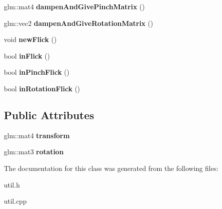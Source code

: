 \begin{DoxyCompactItemize}
\item 
\hypertarget{classpho_1_1flickManager_a413def44a7b636a274657ceb51d67baa}{glm\-::mat4 {\bfseries dampen\-And\-Give\-Pinch\-Matrix} ()}\label{classpho_1_1flickManager_a413def44a7b636a274657ceb51d67baa}

\item 
\hypertarget{classpho_1_1flickManager_af442fac3135f7e5bec29197c995b54d4}{glm\-::vec2 {\bfseries dampen\-And\-Give\-Rotation\-Matrix} ()}\label{classpho_1_1flickManager_af442fac3135f7e5bec29197c995b54d4}

\item 
\hypertarget{classpho_1_1flickManager_aec9a8e9bb6327725b8695a8fc9e4db33}{void {\bfseries new\-Flick} ()}\label{classpho_1_1flickManager_aec9a8e9bb6327725b8695a8fc9e4db33}

\item 
\hypertarget{classpho_1_1flickManager_a598ab994f75f782dd469c4f0c460b6d2}{bool {\bfseries in\-Flick} ()}\label{classpho_1_1flickManager_a598ab994f75f782dd469c4f0c460b6d2}

\item 
\hypertarget{classpho_1_1flickManager_a943d769a59f50e3b14357f7ba5718380}{bool {\bfseries in\-Pinch\-Flick} ()}\label{classpho_1_1flickManager_a943d769a59f50e3b14357f7ba5718380}

\item 
\hypertarget{classpho_1_1flickManager_aa507238327aebfc4f62e9ec659e3ab40}{bool {\bfseries in\-Rotation\-Flick} ()}\label{classpho_1_1flickManager_aa507238327aebfc4f62e9ec659e3ab40}

\end{DoxyCompactItemize}
\subsection*{Public Attributes}
\begin{DoxyCompactItemize}
\item 
\hypertarget{classpho_1_1flickManager_acbed1f6518ff118e93f6e096367022bc}{glm\-::mat4 {\bfseries transform}}\label{classpho_1_1flickManager_acbed1f6518ff118e93f6e096367022bc}

\item 
\hypertarget{classpho_1_1flickManager_a8adf5bbced85f066b09c0a39761aed29}{glm\-::mat3 {\bfseries rotation}}\label{classpho_1_1flickManager_a8adf5bbced85f066b09c0a39761aed29}

\end{DoxyCompactItemize}


The documentation for this class was generated from the following files\-:\begin{DoxyCompactItemize}
\item 
util.\-h\item 
util.\-cpp\end{DoxyCompactItemize}
